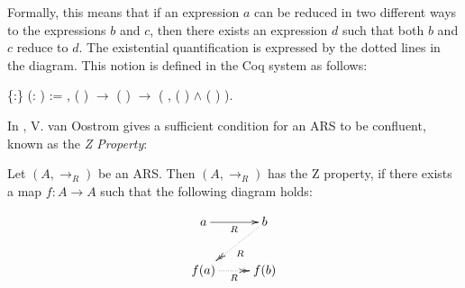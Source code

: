     Formally, this means that if an expression $a$ can be reduced in
    two different ways to the expressions $b$ and $c$, then there
    exists an expression $d$ such that both $b$ and $c$ reduce to
    $d$. The existential quantification is expressed by the dotted
    lines in the diagram. This notion is defined in the Coq system as
    follows: \begin{coqdoccode}
\coqdocemptyline
\coqdocnoindent
{}  \{:\} (:  ) := \coqdockw{\ensuremath{\forall}}   , ( )   \ensuremath{\rightarrow} ( )   \ensuremath{\rightarrow} (\coqdoctac{\ensuremath{\exists}} , ( )   \ensuremath{\land} ( )  ).\coqdoceol
\coqdocemptyline
\end{coqdoccode}
In \cite{dehornoy2008z}, V. van Oostrom gives a sufficient
    condition for an ARS to be confluent, known as the \textit{Z Property}:


    \begin{definition} Let $(A,\to_R)$ be an ARS. Then $(A,\to_R)$
      has the Z property, if there exists a map $f:A \to A$ such that
      the following diagram holds:
    
      \[ \xymatrix{ a \ar[r]_R & b \ar@{.>>}[dl]^R\\ f(a)
      \ar@{.>>}[r]_R & f(b) \\ } \] \end{definition}


